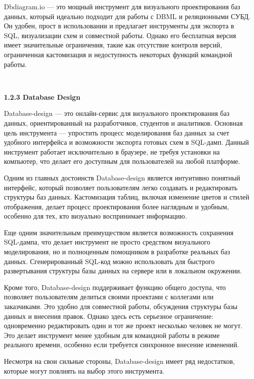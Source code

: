 Dbdiagram.io — это мощный инструмент для визуального проектирования баз данных, который идеально подходит для работы с DBML и реляционными СУБД. Он удобен, прост в использовании и предлагает инструменты для экспорта в SQL, визуализации схем и совместной работы. Однако его бесплатная версия имеет значительные ограничения, такие как отсутствие контроля версий, ограниченная кастомизация и недоступность некоторых функций командной работы.

\

\textbf{\large 1.2.3 Database Design}

Database-design — это онлайн-сервис для визуального проектирования баз данных, ориентированный на разработчиков, студентов и аналитиков. Основная цель инструмента — упростить процесс моделирования баз данных за счет удобного интерфейса и возможности экспорта готовых схем в SQL-дамп. Данный инструмент работает исключительно в браузере, не требуя установки на компьютер, что делает его доступным для пользователей на любой платформе.


Одним из главных достоинств Database-design является интуитивно понятный интерфейс, который позволяет пользователям легко создавать и редактировать структуры баз данных. Кастомизация таблиц, включая изменение цветов и стилей отображения, делает процесс проектирования более наглядным и удобным, особенно для тех, кто визуально воспринимает информацию.

Еще одним значительным преимуществом является возможность сохранения SQL-дампа, что делает инструмент не просто средством визуального моделирования, но и полноценным помощником в разработке реальных баз данных. Сгенерированный SQL-код можно использовать для быстрого развертывания структуры базы данных на сервере или в локальном окружении.

Кроме того, Database-design поддерживает функцию общего доступа, что позволяет пользователям делиться своими проектами с коллегами или заказчиками. Это удобно для совместной работы, обсуждения структуры базы данных и внесения правок. Однако здесь есть серьезное ограничение: одновременно редактировать один и тот же проект несколько человек не могут. Это делает инструмент менее удобным для командной работы в режиме реального времени, особенно если требуется синхронное внесение изменений.

Несмотря на свои сильные стороны, Database-design имеет ряд недостатков, которые могут повлиять на выбор этого инструмента.

